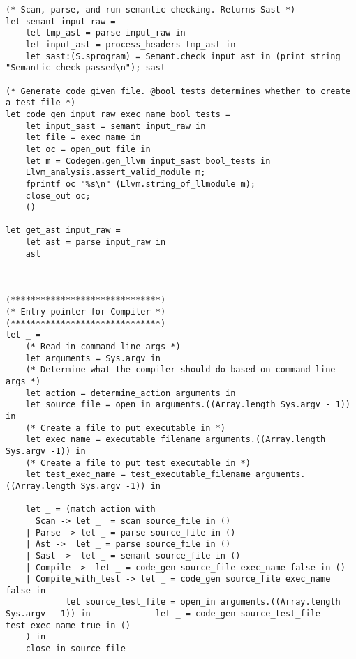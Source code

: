 \documentclass{article}
\begin{document}
\begin{lstlisting}
(* Scan, parse, and run semantic checking. Returns Sast *)
let semant input_raw = 
	let tmp_ast = parse input_raw in
	let input_ast = process_headers tmp_ast in
	let sast:(S.sprogram) = Semant.check input_ast in (print_string "Semantic check passed\n"); sast

(* Generate code given file. @bool_tests determines whether to create a test file *)
let code_gen input_raw exec_name bool_tests =
	let input_sast = semant input_raw in
	let file = exec_name in
	let oc = open_out file in
	let m = Codegen.gen_llvm input_sast bool_tests in 
	Llvm_analysis.assert_valid_module m;
	fprintf oc "%s\n" (Llvm.string_of_llmodule m); 
	close_out oc;
	()

let get_ast input_raw =
	let ast = parse input_raw in
	ast

		
		 
(******************************)
(* Entry pointer for Compiler *)
(******************************)
let _ =
	(* Read in command line args *)
	let arguments = Sys.argv in
	(* Determine what the compiler should do based on command line args *)
	let action = determine_action arguments in
	let source_file = open_in arguments.((Array.length Sys.argv - 1)) in
	(* Create a file to put executable in *)
	let exec_name = executable_filename arguments.((Array.length Sys.argv -1)) in
	(* Create a file to put test executable in *)
	let test_exec_name = test_executable_filename arguments.((Array.length Sys.argv -1)) in
	
	let _ = (match action with 
	  Scan -> let _  = scan source_file in ()
 	| Parse -> let _ = parse source_file in ()
 	| Ast ->  let _ = parse source_file in ()
 	| Sast ->  let _ = semant source_file in () 
	| Compile ->  let _ = code_gen source_file exec_name false in ()
	| Compile_with_test -> let _ = code_gen source_file exec_name false in 
			let source_test_file = open_in arguments.((Array.length Sys.argv - 1)) in 			  let _ = code_gen source_test_file test_exec_name true in ()
	) in
	close_in source_file
\end{lstlisting}
\end{document}
